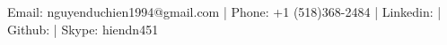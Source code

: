 \documentclass[]{deedy_format_Hien}
\begin{document}
%
%
\lastupdated

%
%


{Email: nguyenduchien1994@gmail.com | Phone: +1 (518)368-2484 | Linkedin: \href{https://www.linkedin.com/in/hien-nguyen-5567149a}{} | Github: \href{https://github.com/nguyenduchien1994}{} | Skype: hiendn451
}

%
%
\end{document}
